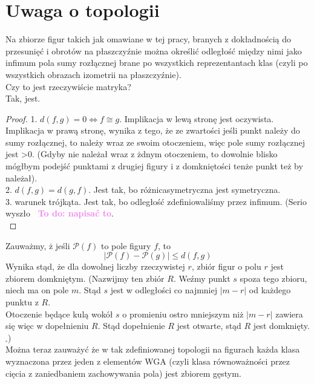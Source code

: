 \documentclass[a4paper, 12pt]{article}
\newcommand{\smalltodoII}[1]{\hfill \break \textbf{\ \textcolor{violet}{To do: #1}}\hfill \break}
\begin{document}
\section{Uwaga o topologii}
Na zbiorze figur takich jak omawiane w tej pracy, branych z dokładnością do przesunięć i obrotów na
płaszczyźnie można określić odległość między nimi jako infimum pola sumy rozłącznej brane po wszystkich
reprezentantach klas (czyli po wszystkich obrazach izometrii na płaszczyźnie). \\
Czy to jest rzeczywiście matryka? \\
Tak, jest. \\
\begin{proof}
    1. $d(f,g) = 0 \iff f \cong g$. Implikacja w lewą stronę jest oczywista. Implikacja w prawą stronę,
    wynika z tego, że ze zwartości jeśli punkt należy do sumy rozłącznej, to należy wraz ze swoim otoczeniem,
     więc pole sumy rozłącznej jest >0. (Gdyby nie należał wraz z żdnym otoczeniem, to dowolnie blisko
     mógłbym podejść punktami z drugiej figury i z domkniętości tenże punkt też by należał). \\
     2. $d(f,g ) = d(g,f)$. Jest tak, bo różnicasymetryczna jest symetryczna. \\
     3. warunek trójkąta. Jest tak, bo odległość zdefiniowaliśmy przez infimum. (Serio wyszło
     \smalltodoII{napisać to}. \\

\end{proof}
Zauważmy, ż jeśli $\mathcal{P}(f)$ to pole figury $f$, to
\begin{equation}
    |\mathcal{P}(f) - \mathcal{P}(g)| \leq d(f, g)
\end{equation}
Wynika stąd, że dla dowolnej liczby rzeczywistej $r$, zbiór figur o polu $r$ jest zbiorem domkniętym.
(Nazwijmy ten zbiór $R$. Weźmy punkt $s$ spoza tego zbioru, niech ma on pole $m$.
Stąd $s$ jest w odległości co najmniej $|m-r|$ od każdego punktu z $R$. \\
Otoczenie będące kulą wokół $s$ o promieniu ostro mniejszym niż $|m - r|$ zawiera się więc w dopełnieniu $R$.
 Stąd dopełnienie $R$ jest otwarte, stąd $R$ jest domknięty. $_\square$)
\\
Można teraz zauważyć że w tak zdefiniowanej topologii na figurach każda klasa wyznaczona przez jeden z
elementów WGA (czyli klasa równoważności przez cięcia z zaniedbaniem zachowywania pola) jest zbiorem gęstym.
\\
\end{document}

